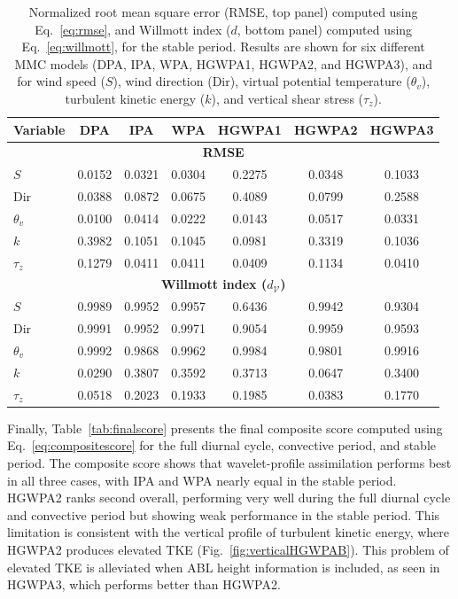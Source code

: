 \begin{table}[htb!]
\centering
\caption{Normalized root mean 
square error (RMSE, top panel) computed using Eq.~\ref{eq:rmse}, and Willmott index ($d$, bottom panel) computed using Eq.~\ref{eq:willmott}, for the stable period. Results are shown for six different MMC models (DPA, IPA, WPA, HGWPA1, HGWPA2, and HGWPA3), and for wind speed ($S$), wind direction (Dir), virtual potential temperature ($\theta_v$), turbulent kinetic energy ($k$), and vertical shear stress ($\tau_z$).}
\label{tab:stable}
\begin{tabular}{lcccccc}
\toprule
Variable & DPA & IPA & WPA & HGWPA1 & HGWPA2 & HGWPA3 \\
\midrule
\multicolumn{7}{c}{\textbf{RMSE}} \\
\midrule
$S$        & 0.0152 & 0.0321 & 0.0304 & 0.2275 & 0.0348 & 0.1033 \\
Dir        & 0.0388 & 0.0872 & 0.0675 & 0.4089 & 0.0799 & 0.2588 \\
$\theta_v$ & 0.0100 & 0.0414 & 0.0222 & 0.0143 & 0.0517 & 0.0331 \\
$k$        & 0.3982 & 0.1051 & 0.1045 & 0.0981 & 0.3319 & 0.1036 \\
$\tau_z$   & 0.1279 & 0.0411 & 0.0411 & 0.0409 & 0.1134 & 0.0410 \\
\midrule
\multicolumn{7}{c}{\textbf{Willmott index ($d_\mathcal{V}$)}} \\
\midrule
$S$        & 0.9989 & 0.9952 & 0.9957 & 0.6436 & 0.9942 & 0.9304 \\
Dir        & 0.9991 & 0.9952 & 0.9971 & 0.9054 & 0.9959 & 0.9593 \\
$\theta_v$ & 0.9992 & 0.9868 & 0.9962 & 0.9984 & 0.9801 & 0.9916 \\
$k$        & 0.0290 & 0.3807 & 0.3592 & 0.3713 & 0.0647 & 0.3400 \\
$\tau_z$   & 0.0518 & 0.2023 & 0.1933 & 0.1985 & 0.0383 & 0.1770 \\
\bottomrule
\end{tabular}
\end{table}

Finally, Table~\ref{tab:finalscore} presents the final composite score computed using Eq.~\ref{eq:compositescore} for the full diurnal cycle, convective period, and stable period. The composite score shows that wavelet-profile assimilation performs best in all three cases, with IPA and WPA nearly equal in the stable period. HGWPA2 ranks second overall, performing very well during the full diurnal cycle and convective period but showing weak performance in the stable period. This limitation is consistent with the vertical profile of turbulent kinetic energy, where HGWPA2 produces elevated TKE (Fig.~\ref{fig:verticalHGWPAB}). This problem of elevated TKE is alleviated when ABL height information is included, as seen in HGWPA3, which performs better than HGWPA2.

